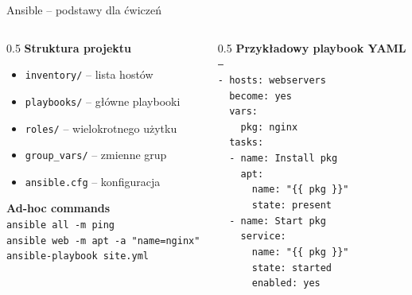 \documentclass{beamer}
\begin{document}
\begin{frame}[fragile]{Ansible -- podstawy dla \'{c}wicze\'n}
    \begin{columns}[T]
        \begin{column}{0.5\textwidth}
            \textbf{Struktura projektu}
            \begin{itemize}
                \item \texttt{inventory/} -- lista host\'ow
                \item \texttt{playbooks/} -- g\l{}\'owne playbooki
                \item \texttt{roles/} -- wielokrotnego u\.zytku
                \item \texttt{group\_vars/} -- zmienne grup
                \item \texttt{ansible.cfg} -- konfiguracja
            \end{itemize}
            \vspace{0.3em}
            \textbf{Ad-hoc commands}\\[0.2em]
            \texttt{\scriptsize ansible all -m ping}\\
            \texttt{\scriptsize ansible web -m apt -a "name=nginx"}\\
            \texttt{\scriptsize ansible-playbook site.yml}
        \end{column}
        \begin{column}{0.5\textwidth}
            \textbf{Przyk\l{}adowy playbook YAML}\\[0.2em]
            \scriptsize
            \texttt{---}\\
            \texttt{- hosts: webservers}\\
            \texttt{\ \ become: yes}\\
            \texttt{\ \ vars:}\\
            \texttt{\ \ \ \ pkg: nginx}\\
            \texttt{\ \ tasks:}\\
            \texttt{\ \ - name: Install pkg}\\
            \texttt{\ \ \ \ apt:}\\
            \texttt{\ \ \ \ \ \ name: "\{\{ pkg \}\}"}\\
            \texttt{\ \ \ \ \ \ state: present}\\
            \texttt{\ \ - name: Start pkg }\\
            \texttt{\ \ \ \ service:}\\
            \texttt{\ \ \ \ \ \ name: "\{\{ pkg \}\}"}\\
            \texttt{\ \ \ \ \ \ state: started}\\
            \texttt{\ \ \ \ \ \ enabled: yes}
        \end{column}
    \end{columns}
\end{frame}
\end{document}
